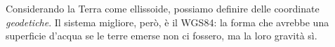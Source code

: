 \documentclass[main.tex]{subfiles}
\begin{document}
Considerando la Terra come ellissoide, possiamo definire delle coordinate \emph{geodetiche}.
Il sistema migliore, però, è il WGS84: la forma che avrebbe una superficie d'acqua se le terre emerse non ci fossero, ma la loro gravità sì. 

\end{document}

